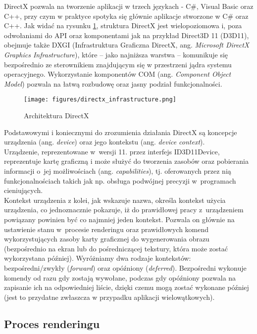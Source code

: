 DirectX pozwala na tworzenie aplikacji w trzech językach - C\#, Visual Basic oraz C++, przy czym w praktyce spotyka się głównie aplikacje stworzone w C\# oraz C++.
Jak widać na rysunku \ref{directx_infrastructure}, struktura DirectX jest wielopoziomowa i, poza odwołaniami do API oraz komponentami jak na przykład Direct3D 11 (D3D11), obejmuje także DXGI (Infrastruktura Graficzna DirectX, ang. \emph{Microsoft DirectX Graphics Infrastructure}), które -- jako najniższa warstwa -- komunikuje się bezpośrednio ze sterownikiem znajdującym się w przestrzeni jądra systemu operacyjnego. Wykorzystanie komponentów COM (ang. \emph{Component Object Model}) pozwala na łatwą rozbudowę oraz jasny podział funkcjonalności.\\
\begin{figure}
\begin{center}
\texttt{[image: figures/directx\_infrastructure.png]}
\caption{Architektura DirectX}
\label{directx_infrastructure}
\end{center}
\end{figure}
Podstawowymi i koniecznymi do zrozumienia działania DirectX są koncepcje urządzenia (ang. \emph{device}) oraz jego kontekstu (ang. \emph{device context}).\\
Urządzenie, reprezentowane w~wersji 11. przez interfejs ID3D11Device, reprezentuje kartę graficzną i może służyć do tworzenia zasobów oraz pobierania informacji o~jej możliwościach (ang. \emph{capabilities}), tj. oferowanych przez nią funkcjonalnościach takich jak np. obsługa podwójnej precyzji w~programach cieniujących.\\
Kontekst urządzenia z kolei, jak wskazuje nazwa, określa kontekst użycia urządzenia, co jednoznacznie pokazuje, iż do prawidłowej pracy z~urządzeniem powiązany powinien być co najmniej jeden kontekst. Pozwala on głównie na ustawienie stanu w~procesie renderingu oraz prawidłowych komend wykorzystujących zasoby karty graficznej do wygenerowania obrazu (bezpośrednio na ekran lub do pośredniczącej tekstury, która może zostać wykorzystana później). Wyróżniamy dwa rodzaje kontekstów: bezpośredni/zwykły (\emph{forward}) oraz opóźniony (\emph{deferred}). Bezpośredni wykonuje komendy od razu gdy zostają wywołane, podczas gdy opóźniony pozwala na zapisanie ich na odpowiedniej liście, dzięki czemu mogą zostać wykonane później (jest to przydatne zwłaszcza w przypadku aplikacji wielowątkowych).\\

\subsection{Proces renderingu}

